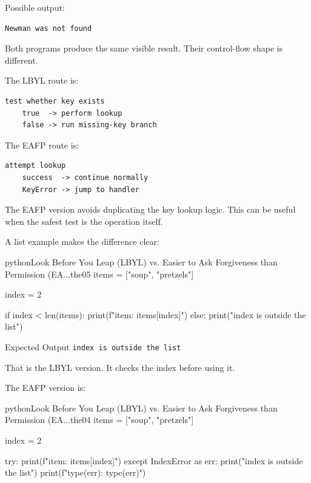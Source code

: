 Possible output:

\begin{verbatim}
Newman was not found
\end{verbatim}

Both programs produce the same visible result. Their control-flow shape is different.

The LBYL route is:

\begin{verbatim}
test whether key exists
    true  -> perform lookup
    false -> run missing-key branch
\end{verbatim}

The EAFP route is:

\begin{verbatim}
attempt lookup
    success  -> continue normally
    KeyError -> jump to handler
\end{verbatim}

The EAFP version avoids duplicating the key lookup logic. This can be useful when the safest test is the operation itself.

A list example makes the difference clear:

\begin{codebox}[]{python}{Look Before You Leap (LBYL) vs. Easier to Ask Forgiveness than Permission (EA...}{the05}
items = ["soup", "pretzels"]

index = 2

if index < len(items):
    print(f"item: {items[index]}")
else:
    print("index is outside the list")
\end{codebox}


\begin{iobox}{Expected Output}
\texttt{index is outside the list} \\
\end{iobox}


That is the LBYL version. It checks the index before using it.

The EAFP version is:

\begin{codebox}[]{python}{Look Before You Leap (LBYL) vs. Easier to Ask Forgiveness than Permission (EA...}{the04}
items = ["soup", "pretzels"]

index = 2

try:
    print(f"item: {items[index]}")
except IndexError as err:
    print("index is outside the list")
    print(f"type(err): {type(err)}")
\end{codebox}


